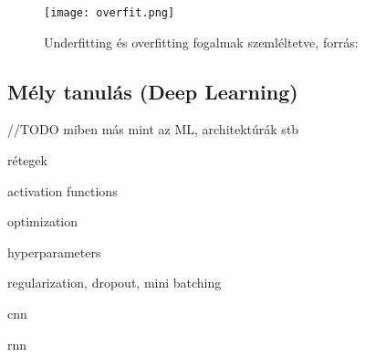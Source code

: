 \begin{figure}[H]
  \texttt{[image: overfit.png]}
  \caption{Underfitting és overfitting fogalmak szemléltetve, forrás: \cite{deeplearningbook} }
\end{figure}


\subsection{Mély tanulás (Deep Learning)}


//TODO  miben más mint az ML, architektúrák stb

rétegek

activation functions

optimization

hyperparameters

regularization, dropout, mini batching

cnn

rnn
